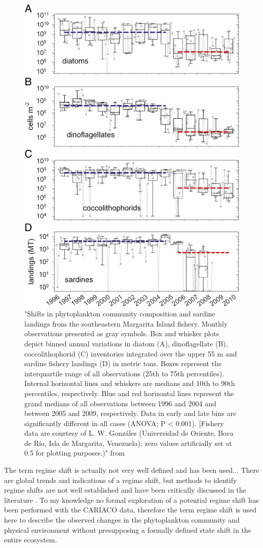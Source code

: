 \begin{figure}
\centering
\includegraphics[trim = 0mm 0mm 0mm 0mm, clip, width=0.7\linewidth]{./Chp2-Pre/Tayloretal2012_F3.large.jpg}
\caption[Scheme]{\small {"Shifts in phytoplankton community composition and sardine landings from the southeastern Margarita Island fishery. Monthly observations presented as gray symbols. Box and whisker plots depict binned annual variations in diatom (A), dinoflagellate (B), coccolithophorid (C) inventories integrated over the upper 55 m and sardine fishery landings (D) in metric tons. Boxes represent the interquartile range of all observations (25th to 75th percentiles). Internal horizontal lines and whiskers are medians and 10th to 90th percentiles, respectively. Blue and red horizontal lines represent the grand medians of all observations between 1996 and 2004 and between 2005 and 2009, respectively. Data in early and late bins are significantly different in all cases (ANOVA; P < 0.001). [Fishery data are courtesy of L. W. Gonzáles (Universidad de Oriente, Boca de Río, Isla de Margarita, Venezuela); zero values artificially set at 0.5 for plotting purposes.)" from \citet{Taylor2012}}}
\label{PrinComp}
\end{figure}




The term regime shift is actually not very well defined and has been used... \citep{DeYoung2004a}
There are global trends and indications of a regime shift, but methods to identify regime shifts are not well established and have been critically discussed in the literature \citep{Steele2004a, Mantua2004a, Litzow2016a}. To my knowledge no formal exploration of a potential regime shift has been performed with the CARIACO data, therefore the term regime shift is used here to describe the observed changes in the phytoplankton community and physical environment without presupposing a formally defined state shift in the entire ecosystem. 


